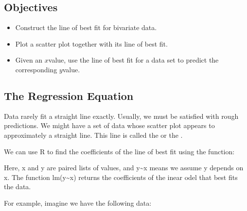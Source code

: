 \documentclass[letterpaper,10pt,english]{jupyterBook}
\begin{document}
\subsection{Objectives}
\label{\detokenize{Ch8 Correlation and Linear Regression/8.3 The Regression Equation:objectives}}\begin{itemize}
\item {} 
\sphinxAtStartPar
Construct the line of best fit for bivariate data.

\item {} 
\sphinxAtStartPar
Plot a scatter plot together with its line of best fit.

\item {} 
\sphinxAtStartPar
Given an \(x\)\sphinxhyphen{}value, use the line of best fit for a data set to predict the corresponding \(y\)\sphinxhyphen{}value.

\end{itemize}


\subsection{The Regression Equation}
\label{\detokenize{Ch8 Correlation and Linear Regression/8.3 The Regression Equation:id1}}
\sphinxAtStartPar
Data rarely fit a straight line exactly. Usually, we must be satisfied with rough predictions. We might have a set of data whose scatter plot appears to approximately  a straight line. This line is called the  or the .

\sphinxAtStartPar
We can use R to find the coefficients of the line of best fit using the function:

\begin{sphinxVerbatim}[commandchars=\\\{\}]
\end{sphinxVerbatim}

\sphinxAtStartPar
Here, x and y are paired lists of values, and y\textasciitilde{}x means we assume y depends on x. The function lm(y\textasciitilde{}x) returns the coefficients of the inear odel that best fits the data.

\sphinxAtStartPar
For example, imagine we have the following data:
\end{document}
